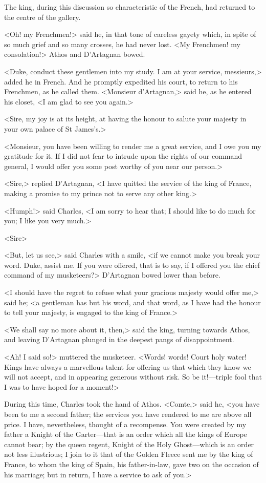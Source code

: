 The king, during this discussion so characteristic of the French, had returned to the centre of the gallery.

<Oh! my Frenchmen!> said he, in that tone of careless gayety which, in spite of so much grief and so many crosses, he had never lost. <My Frenchmen! my consolation!> Athos and D'Artagnan bowed.

<Duke, conduct these gentlemen into my study. I am at your service, messieurs,> added he in French. And he promptly expedited his court, to return to his Frenchmen, as he called them. <Monsieur d'Artagnan,> said he, as he entered his closet, <I am glad to see you again.>

<Sire, my joy is at its height, at having the honour to salute your majesty in your own palace of St James's.>

<Monsieur, you have been willing to render me a great service, and I owe you my gratitude for it. If I did not fear to intrude upon the rights of our command general, I would offer you some post worthy of you near our person.>

<Sire,> replied D'Artagnan, <I have quitted the service of the king of France, making a promise to my prince not to serve any other king.>

<Humph!> said Charles, <I am sorry to hear that; I should like to do much for you; I like you very much.>

<Sire\longdash>

<But, let us see,> said Charles with a smile, <if we cannot make you break your word. Duke, assist me. If you were offered, that is to say, if I offered you the chief command of my musketeers?> D'Artagnan bowed lower than before.

<I should have the regret to refuse what your gracious majesty would offer me,> said he; <a gentleman has but his word, and that word, as I have had the honour to tell your majesty, is engaged to the king of France.>

<We shall say no more about it, then,> said the king, turning towards Athos, and leaving D'Artagnan plunged in the deepest pangs of disappointment.

<Ah! I said so!> muttered the musketeer. <Words! words! Court holy water! Kings have always a marvellous talent for offering us that which they know we will not accept, and in appearing generous without risk. So be it!—triple fool that I was to have hoped for a moment!>

During this time, Charles took the hand of Athos. <Comte,> said he, <you have been to me a second father; the services you have rendered to me are above all price. I have, nevertheless, thought of a recompense. You were created by my father a Knight of the Garter—that is an order which all the kings of Europe cannot bear; by the queen regent, Knight of the Holy Ghost—which is an order not less illustrious; I join to it that of the Golden Fleece sent me by the king of France, to whom the king of Spain, his father-in-law, gave two on the occasion of his marriage; but in return, I have a service to ask of you.>


